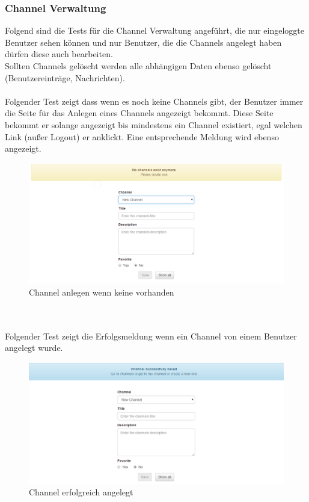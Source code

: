 \documentclass[11pt, a4paper, twoside]{article}   	%
\begin{document}
\subsubsection{Channel Verwaltung}
Folgend sind die Tests für die Channel Verwaltung angeführt, die nur eingeloggte Benutzer sehen können und nur Benutzer, die die Channels angelegt haben dürfen diese auch bearbeiten.\\
Sollten Channels gelöscht werden alle abhängigen Daten ebenso gelöscht (Benutzereinträge, Nachrichten).\\\\
Folgender Test zeigt dass wenn es noch keine Channels gibt, der Benutzer immer die Seite für das Anlegen eines Channels angezeigt bekommt. Diese Seite bekommt er solange angezeigt bis mindestens ein Channel existiert, egal welchen Link (außer Logout) er anklickt. Eine entsprechende Meldung wird ebenso angezeigt.
\begin{figure}[h]
	\centering
	\includegraphics[scale=0.5]{images/start_new_channel_no_channels.PNG}
	\caption
	{Channel anlegen wenn keine vorhanden}
\end{figure}\\\\

Folgender Test zeigt die Erfolgsmeldung wenn ein Channel von einem Benutzer angelegt wurde.
\begin{figure}[h]
	\centering
	\includegraphics[scale=0.5]{images/start_new_channel_successful.PNG}
	\caption
	{Channel erfolgreich angelegt}
\end{figure}\\\\
\newpage
\end{document}
